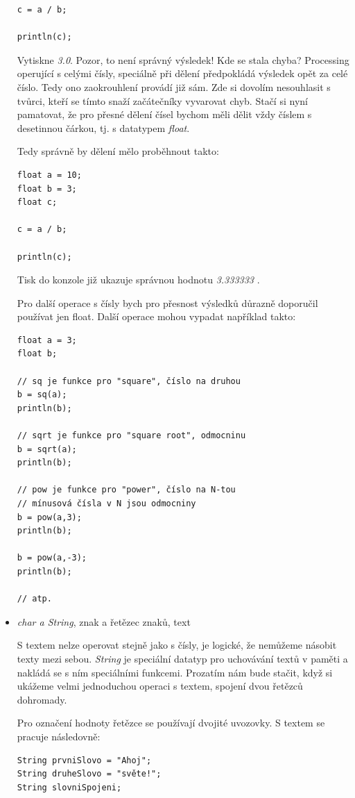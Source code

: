 \documentclass[11pt]{book}
\begin{document}
\begin{itemize}
\begin{lstlisting}
c = a / b;

println(c); 
\end{lstlisting}

Vytiskne {\em 3.0}. Pozor, to není správný výsledek! Kde se stala chyba? Processing operující s celými čísly, speciálně při dělení předpokládá výsledek opět za celé číslo. Tedy ono zaokrouhlení provádí již sám. Zde si dovolím nesouhlasit s tvůrci, kteří se tímto snaží začátečníky vyvarovat chyb. Stačí si nyní pamatovat, že pro přesné dělení čísel bychom měli dělit vždy číslem s desetinnou čárkou, tj. s datatypem {\em float}.

Tedy správně by dělení mělo proběhnout takto:

\begin{lstlisting}
float a = 10;
float b = 3;
float c;

c = a / b;

println(c); 
\end{lstlisting}

Tisk do konzole již ukazuje správnou hodnotu {\em 3.333333} .

Pro další operace s čísly bych pro přesnost výsledků důrazně doporučil používat jen float. Další operace mohou vypadat například takto:

\begin{lstlisting}
float a = 3;
float b;

// sq je funkce pro "square", číslo na druhou
b = sq(a);
println(b);

// sqrt je funkce pro "square root", odmocninu
b = sqrt(a);
println(b);

// pow je funkce pro "power", číslo na N-tou
// mínusová čísla v N jsou odmocniny
b = pow(a,3);
println(b);

b = pow(a,-3);
println(b);

// atp.
\end{lstlisting}

\item{{\em char a String}, znak a řetězec znaků, text}

S textem nelze operovat stejně jako s čísly, je logické, že nemůžeme násobit texty mezi sebou. {\em String} je speciální datatyp pro uchovávání textů v paměti a nakládá se s ním speciálními funkcemi. Prozatím nám bude stačit, když si ukážeme velmi jednoduchou operaci s textem, spojení dvou řetězců dohromady.

Pro označení hodnoty řetězce se používají dvojité uvozovky. S textem se pracuje následovně:

\begin{lstlisting}
String prvniSlovo = "Ahoj";
String druheSlovo = "světe!";
String slovniSpojeni;


\end{lstlisting}
\end{itemize}
\end{document}
